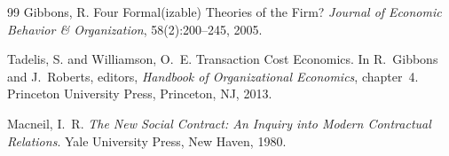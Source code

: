 \documentclass[11pt,a4paper]{article}
\theoremstyle{definition}
\theoremstyle{remark}
\begin{document}
\begin{thebibliography}{99}
Gibbons, R.
\newblock Four Formal(izable) Theories of the Firm?
\newblock \emph{Journal of Economic Behavior \& Organization},
  58(2):200--245, 2005.

Tadelis, S. and Williamson, O.~E.
\newblock Transaction Cost Economics.
\newblock In R.~Gibbons and J.~Roberts, editors, \emph{Handbook of
  Organizational Economics}, chapter~4. Princeton University Press,
  Princeton, NJ, 2013.

Macneil, I.~R.
\newblock \emph{The New Social Contract: An Inquiry into Modern
  Contractual Relations}.
\newblock Yale University Press, New Haven, 1980.

\end{thebibliography}
\end{document}
